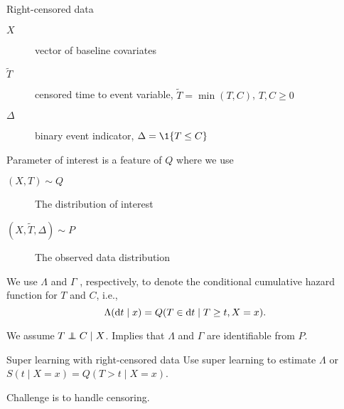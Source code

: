 \documentclass[smaller]{beamer}\usepackage{listings}
\begin{document}
\begin{frame}[label={sec:orgb92ad56}]{Right-censored data}
\begin{description}
\item[{\(X\)}] vector of baseline covariates
\item[{\(\tilde T\)}] censored time to event variable, \(\tilde T = \min(T, C)\),
\(T,C\geq 0\)
\item[{\(\Delta\)}] binary event indicator, \(\Delta = \1{\{T \leq C\}}\)
\end{description}

Parameter of interest is a feature of \(Q\) where we use

\begin{description}
\item[{\((X, T) \sim Q\)}] The distribution of interest
\item[{\((X, \tilde T, \Delta) \sim P\)}] The observed data distribution
\end{description}

We use \color{bblue} \(\Lambda\) \color{black} and \color{bblue} \(\Gamma\)
\color{black}, respectively, to denote the conditional cumulative hazard
function for \(T\) and \(C\), i.e.,
\begin{equation*}
  \Lambda(\mathop{}\!\mathrm{d} t \mid x) = Q(T \in \mathop{}\!\mathrm{d} t \mid T \geq t, X=x).
\end{equation*}

We assume \(T \independent C \mid X\). Implies that \(\Lambda\) and \(\Gamma\) are
identifiable from \(P\).
\end{frame}


\begin{frame}[label={sec:org8cfe546}]{Super learning with right-censored data}
Use super learning to estimate \(\Lambda\) or \(S(t \mid X=x) = Q(T > t \mid
X=x)\).

Challenge is to handle censoring. 
\end{frame}
\end{document}
